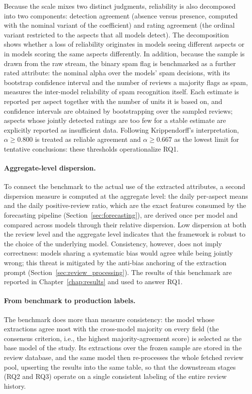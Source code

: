 Because the scale mixes two distinct judgments, reliability is also decomposed into two components: detection agreement (absence versus presence, computed with the nominal variant of the coefficient) and rating agreement (the ordinal variant restricted to the aspects that all models detect). The decomposition shows whether a loss of reliability originates in models seeing different aspects or in models scoring the same aspects differently. In addition, because the sample is drawn from the raw stream, the binary spam flag is benchmarked as a further rated attribute: the nominal alpha over the models' spam decisions, with its bootstrap confidence interval and the number of reviews a majority flags as spam, measures the inter-model reliability of spam recognition itself. Each estimate is reported per aspect together with the number of units it is based on, and confidence intervals are obtained by bootstrapping over the sampled reviews; aspects whose jointly detected ratings are too few for a stable estimate are explicitly reported as insufficient data. Following Krippendorff's interpretation, $\alpha \geq 0.800$ is treated as reliable agreement and $\alpha \geq 0.667$ as the lowest limit for tentative conclusions: these thresholds operationalize RQ1.

\paragraph{Aggregate-level dispersion.} To connect the benchmark to the actual use of the extracted attributes, a second dispersion measure is computed at the aggregate level: the daily per-aspect means and the daily positive-review ratio, which are the exact features consumed by the forecasting pipeline (Section~\ref{sec:forecasting}), are derived once per model and compared across models through their relative dispersion. Low dispersion at both the review level and the aggregate level indicates that the framework is robust to the choice of the underlying model. Consistency, however, does not imply correctness: models sharing a systematic bias would agree while being jointly wrong; this threat is mitigated by the anti-bias anchoring of the extraction prompt (Section~\ref{sec:review_processing}). The results of this benchmark are reported in Chapter~\ref{chap:results} and used to answer RQ1.

\paragraph{From benchmark to production labels.} The benchmark does more than measure consistency: the model whose extractions agree most with the cross-model majority on every field (the consensus criterion, i.e., the highest majority-agreement score) is selected as the base model of the study. Its extractions over the frozen sample are stored in the review database, and the same model then re-processes the whole fetched review pool, upserting the results into the same table, so that the downstream stages (RQ2 and RQ3) operate on a single consistent labeling of the entire review history.

